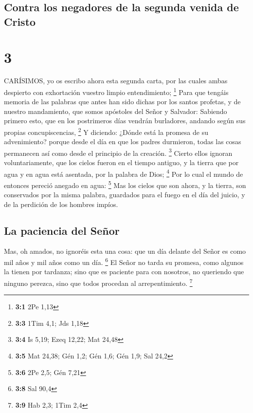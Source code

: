 \hypertarget{contra-los-negadores-de-la-segunda-venida-de-cristo}{%
\subsection{Contra los negadores de la segunda venida de
Cristo}\label{contra-los-negadores-de-la-segunda-venida-de-cristo}}

\hypertarget{section-2}{%
\section{3}\label{section-2}}

 CARÍSIMOS, yo os escribo ahora esta segunda carta, por las
cuales ambas despierto con exhortación vuestro limpio entendimiento;
\footnote{\textbf{3:1} 2Pe 1,13}  Para que tengáis memoria
de las palabras que antes han sido dichas por los santos profetas, y de
nuestro mandamiento, que somos apóstoles del Señor y Salvador:
 Sabiendo primero esto, que en los postrimeros días vendrán
burladores, andando según sus propias concupiscencias, \footnote{\textbf{3:3}
  1Tim 4,1; Jds 1,18}  Y diciendo: ¿Dónde está la promesa de
su advenimiento? porque desde el día en que los padres durmieron, todas
las cosas permanecen así como desde el principio de la creación.
\footnote{\textbf{3:4} Is 5,19; Ezeq 12,22; Mat 24,48} 
Cierto ellos ignoran voluntariamente, que los cielos fueron en el tiempo
antiguo, y la tierra que por agua y en agua está asentada, por la
palabra de Dios; \footnote{\textbf{3:5} Mat 24,38; Gén 1,2; Gén 1,6; Gén
  1,9; Sal 24,2}  Por lo cual el mundo de entonces pereció
anegado en agua: \footnote{\textbf{3:6} 2Pe 2,5; Gén 7,21} 
Mas los cielos que son ahora, y la tierra, son conservados por la misma
palabra, guardados para el fuego en el día del juicio, y de la perdición
de los hombres impíos.

\hypertarget{la-paciencia-del-seuxf1or}{%
\subsection{La paciencia del Señor}\label{la-paciencia-del-seuxf1or}}

 Mas, oh amados, no ignoréis esta una cosa: que un día
delante del Señor es como mil años y mil años como un día. \footnote{\textbf{3:8}
  Sal 90,4}  El Señor no tarda su promesa, como algunos la
tienen por tardanza; sino que es paciente para con nosotros, no
queriendo que ninguno perezca, sino que todos procedan al
arrepentimiento. \footnote{\textbf{3:9} Hab 2,3; 1Tim 2,4}

